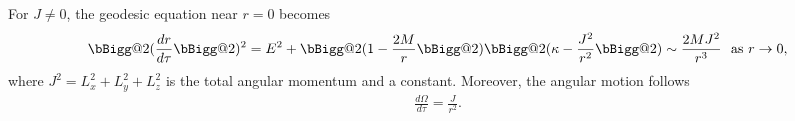 \documentclass[pdflatex,sn-mathphys-num]{sn-jnl}
\makeatletter
\newcommand{\vast}{\bBigg@{2}}
\theoremstyle{definition}
\makeatother
\begin{document}
For $J \neq 0$, the geodesic equation near $r=0$ becomes
\begin{align}
     \vast(\frac{dr}{d\tau}\vast)^2 = E^2 + \vast(1-\frac{2M}{r}\vast)\vast(\kappa - \frac{J^2}{r^2}\vast) \sim \frac{2MJ^2}{r^3} ~~\text{as }r \rightarrow 0\label{drdtau1},
\end{align}
where $J^2 = L_x^2 + L_y^2 + L_z^2$ is the total angular momentum and a constant. Moreover, the angular motion follows
\begin{align*}
    \frac{d\Omega}{d\tau} = \frac{J}{r^2}.
\end{align*}
\end{document}
